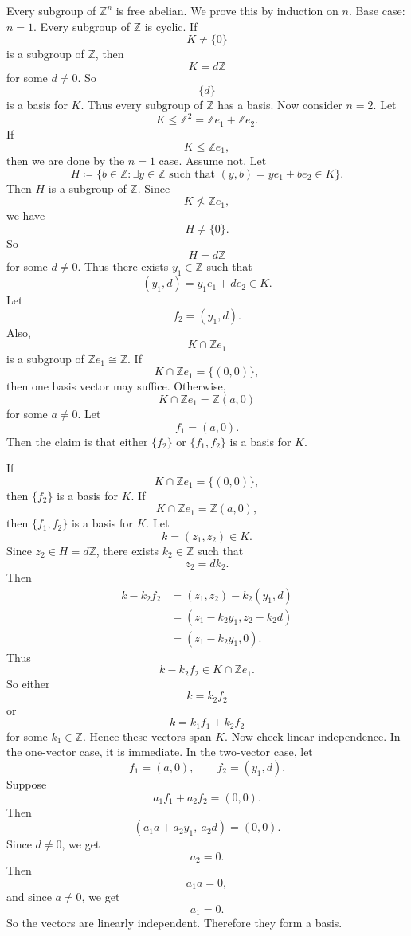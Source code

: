 \begin{theorem}{
Every subgroup of $\mathbb{Z}^n$ is free abelian.
}
We prove this by induction on $n$.
Base case:
$n=1$.
Every subgroup of $\mathbb{Z}$ is cyclic.
If
\[
K\neq \{0\}
\]
is a subgroup of $\mathbb{Z}$, then
\[
K=d\mathbb{Z}
\]
for some $d\neq 0$.
So
\[
\{d\}
\]
is a basis for $K$.
Thus every subgroup of $\mathbb{Z}$ has a basis.
Now consider $n=2$.
Let
\[
K\leq \mathbb{Z}^2=\mathbb{Z}e_1+\mathbb{Z}e_2.
\]
If
\[
K\leq \mathbb{Z}e_1,
\]
then we are done by the $n=1$ case.
Assume not.
Let
\[
H\coloneqq \{b\in \mathbb{Z}:\exists y\in \mathbb{Z}\text{ such that }(y,b)=ye_1+be_2\in K\}.
\]
Then $H$ is a subgroup of $\mathbb{Z}$.
Since
\[
K\nleq \mathbb{Z}e_1,
\]
we have
\[
H\neq \{0\}.
\]
So
\[
H=d\mathbb{Z}
\]
for some $d\neq 0$.
Thus there exists $y_1\in \mathbb{Z}$ such that
\[
(y_1,d)=y_1e_1+de_2\in K.
\]
Let
\[
f_2=(y_1,d).
\]
Also,
\[
K\cap \mathbb{Z}e_1
\]
is a subgroup of $\mathbb{Z}e_1\cong \mathbb{Z}$.
If
\[
K\cap \mathbb{Z}e_1=\{(0,0)\},
\]
then one basis vector may suffice.
Otherwise,
\[
K\cap \mathbb{Z}e_1=\mathbb{Z}(a,0)
\]
for some $a\neq 0$.
Let
\[
f_1=(a,0).
\]
Then the claim is that either $\{f_2\}$ or $\{f_1,f_2\}$ is a basis for $K$.
\end{theorem}

\begin{lemma}{
If
\[
K\cap \mathbb{Z}e_1=\{(0,0)\},
\]
then $\{f_2\}$ is a basis for $K$.
If
\[
K\cap \mathbb{Z}e_1=\mathbb{Z}(a,0),
\]
then $\{f_1,f_2\}$ is a basis for $K$.
}
Let
\[
k=(z_1,z_2)\in K.
\]
Since $z_2\in H=d\mathbb{Z}$, there exists $k_2\in \mathbb{Z}$ such that
\[
z_2=dk_2.
\]
Then
\begin{align*}
k-k_2f_2
&=
(z_1,z_2)-k_2(y_1,d)\\
&=
(z_1-k_2y_1,z_2-k_2d)\\
&=
(z_1-k_2y_1,0).
\end{align*}
Thus
\[
k-k_2f_2\in K\cap \mathbb{Z}e_1.
\]
So either
\[
k=k_2f_2
\]
or
\[
k=k_1f_1+k_2f_2
\]
for some $k_1\in \mathbb{Z}$.
Hence these vectors span $K$.
Now check linear independence.
In the one-vector case, it is immediate.
In the two-vector case, let
\[
f_1=(a,0),
\qquad
f_2=(y_1,d).
\]
Suppose
\[
a_1f_1+a_2f_2=(0,0).
\]
Then
\[
(a_1a+a_2y_1,\ a_2d)=(0,0).
\]
Since $d\neq 0$, we get
\[
a_2=0.
\]
Then
\[
a_1a=0,
\]
and since $a\neq 0$, we get
\[
a_1=0.
\]
So the vectors are linearly independent.
Therefore they form a basis.
\end{lemma}